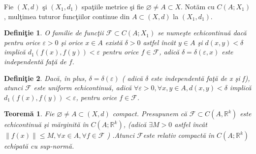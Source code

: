 \documentclass[a4paper,12pt,oneside]{report}
\newtheorem{definition}{Defini\c tie}
\newtheorem{theorem}{Teorem\u a}
\begin{document}
Fie \(\left ( X,d \right )\) \c{s}i \(\left ( X_{1},d_{1} \right )\) spa\c{t}iile metrice \c{s}i fie \(\varnothing \neq A\subset X\). Not\u{a}m cu \(C\left ( A;X_{1} \right )\), mul\c{t}imea tuturor func\c{t}iilor continue din \(A\subset \left ( X,d \right )\) la \(\left ( X_{1},d_{1} \right )\).
\begin{definition}
O familie de func\c{t}ii \(\mathcal{F} \subset C\left ( A;X_{1} \right )\) se nume\c{s}te echicontinu\u{a} dac\u{a} pentru orice \(\varepsilon > 0\) \c{s}i orice \(x \in A\) exist\u{a} \(\delta > 0\) astfel \^{i}nc\^{a}t \(y \in A\) \c{s}i \(d\left ( x,y \right )< \delta \) implic\u{a} \(d_{1}\left ( f\left ( x \right ),f\left ( y \right ) \right )< \varepsilon \) pentru orice \(f \in \mathcal{F} \), adic\u{a} \(\delta =\delta \left ( \varepsilon ,x \right )\) este independent\u{a} fa\c{t}\u{a} de \(f\).
\end{definition}
\begin{definition}
Dac\u{a}, \^{i}n plus, \(\delta =\delta \left ( \varepsilon  \right )\) ( adic\u{a} \(\delta\) este independent\u{a} fa\c{t}\u{a} de x \c{s}i f), atunci \(\mathcal{F}\) este uniform echicontinu\u{a}, adic\u{a} \(\forall \varepsilon > 0, \forall x,y \in A, d\left ( x,y \right )< \delta \) implic\u{a} \(d_{1}\left ( f\left ( x \right ), f\left ( y \right ) \right )< \varepsilon \), pentru orice \(f\in \mathcal{F}\).
\end{definition}
\begin{theorem}
Fie \(\varnothing \neq A\subset \left ( X,d \right )\) compact. Presupunem c\u{a} \(\mathcal{F} \subset C\left ( A,\mathbb{R}^{k} \right )\) este echicontinu\u{a} \c{s}i m\u{a}rginit\u{a} \^{i}n \(C\left ( A;\mathbb{R}^{k} \right )\), (adic\u{a} \(\exists M> 0\) astfel \^{i}nc\^{a}t \(\left \| f\left ( x \right ) \right \| \leq M, \forall x \in A, \forall f \in \mathcal{F}\) ) .Atunci \(\mathcal{F}\)este relativ compact\u{a} \^{i}n \(C\left ( A;\mathbb{R}^{k} \right )\) echipat\u{a} cu sup-norm\u{a}.
\end{theorem}
\end{document}
